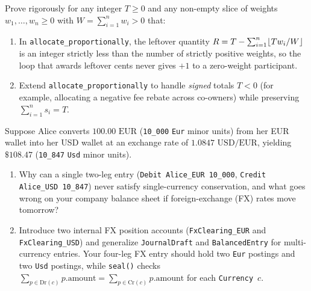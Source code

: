 \begin{exercise}
Prove rigorously for any integer $T \ge 0$ and any non-empty slice of weights $w_1, \dots, w_n \ge 0$ with $W = \sum_{i=1}^n w_i > 0$ that:
\begin{enumerate}
  \item In \texttt{allocate\_proportionally}, the leftover quantity $R = T - \sum_{i=1}^n \lfloor T w_i / W\rfloor$ is an integer strictly less than the number of strictly positive weights, so the loop that awards leftover cents never gives $+1$ to a zero-weight participant.
  \item Extend \texttt{allocate\_proportionally} to handle \emph{signed} totals $T < 0$ (for example, allocating a negative fee rebate across co-owners) while preserving $\sum_{i=1}^n s_i = T$.
\end{enumerate}
\end{exercise}

\begin{exercise}
Suppose Alice converts $100.00\text{ EUR}$ (\texttt{10\_000} \texttt{Eur} minor units) from her EUR wallet into her USD wallet at an exchange rate of $1.0847\text{ USD/EUR}$, yielding $\$108.47$ (\texttt{10\_847} \texttt{Usd} minor units).
\begin{enumerate}
  \item Why can a single two-leg entry (\texttt{Debit Alice\_EUR 10\_000}, \texttt{Credit Alice\_USD 10\_847}) never satisfy single-currency conservation, and what goes wrong on your company balance sheet if foreign-exchange (FX) rates move tomorrow?
  \item Introduce two internal FX position accounts (\texttt{FxClearing\_EUR} and \texttt{FxClearing\_USD}) and generalize \texttt{JournalDraft} and \texttt{BalancedEntry} for multi-currency entries. Your four-leg FX entry should hold two \texttt{Eur} postings and two \texttt{Usd} postings, while \texttt{seal()} checks $\sum_{p \in \text{Dr}(c)} p.\text{amount} = \sum_{p \in \text{Cr}(c)} p.\text{amount}$ for each \texttt{Currency}~$c$.
\end{enumerate}
\end{exercise}


